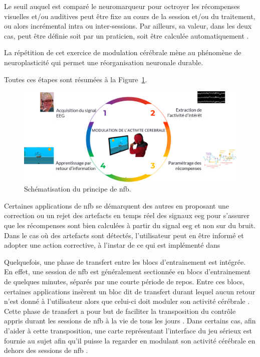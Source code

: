 Le seuil auquel est comparé le neuromarqueur pour octroyer les récompenses visuelles et/ou auditives peut être fixe 
au cours de la session et/ou du traitement, ou alors incrémental intra ou inter-sessions. Par ailleurs, sa valeur, dans 
les deux cas, peut être définie soit par un praticien, soit être calculée automatiquement \citep{Arns2014}. 

La répétition de cet exercice de modulation cérébrale mène au phénomène de 
neuroplasticité \citep{VanDoren2017, Ros2010} qui permet une réorganisation neuronale durable.

Toutes ces étapes sont résumées à la Figure~\ref{Figure:introduction_nfb_explications}.

\begin{figure}[h!]
  \centering
	\includegraphics[width=1\linewidth]{figures/chapter-1/introduction-nfb-explication} 
  \caption{Schématisation du principe de \gls{nfb}.}
  \label{Figure:introduction_nfb_explications}
\end{figure}

Certaines applications de \gls{nfb} se démarquent des autres en proposant une correction ou un rejet des artefacts en temps réel des signaux \gls{eeg}
\citep{Maurizio2014, Barthelemy2019, Barthelemy2017} pour s'assurer que les récompenses sont bien calculées à partir du signal \gls{eeg} et non sur du bruit. 
Dans le cas où des artefacts sont détectés, l'utilisateur peut en être informé et adopter une action corrective, à l'instar de ce qui est implémenté dans 
\citep{Bioulac2019}

Quelquefois, une phase de transfert entre les blocs d'entrainement est intégrée. En effet, une session de \gls{nfb} est 
généralement sectionnée en blocs d'entrainement de quelques minutes, séparés par une courte période de repos. Entre ces blocs, certaines applications insèrent 
un bloc dit de transfert durant lequel aucun retour n'est donné à l'utilisateur alors que celui-ci doit moduler son activité cérébrale \citep{Bioulac2019,
Bluschke2016}. Cette phase de transfert a pour but de faciliter la transposition du contrôle appris durant les 
sessions de \gls{nfb} à la vie de tous les jours \citep{Arns2014}. Dans certains cas, afin d'aider à cette transposition, une carte représentant l'interface du jeu sérieux est 
fournie au sujet afin qu'il puisse la regarder en modulant son activité cérébrale en dehors des sessions de \gls{nfb} \citep{Leins2007}. 

